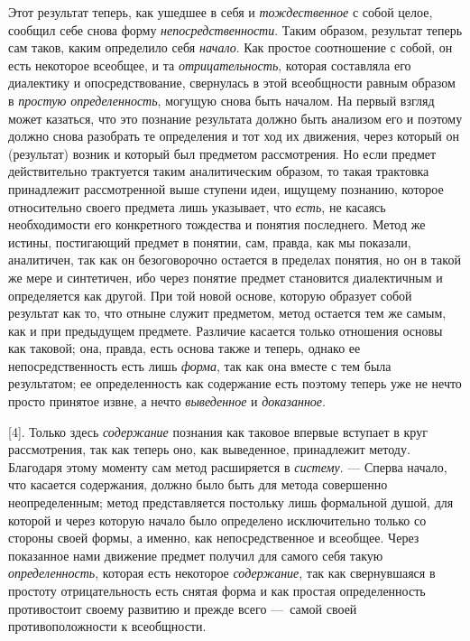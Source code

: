 \documentclass[twoside]{article}
\begin{document}
{{Этот результат теперь, как ушедшее в себя и
{\em тождественное} с
собой целое, сообщил себе снова форму
{\em непосредственности}.
Таким образом, результат теперь сам таков, каким определило
себя {\em начало}. Как
простое соотношение с собой, он есть некоторое всеобщее, и та
{\em отрицательность},
которая составляла его диалектику и опосредствование,
свернулась в этой всеобщности равным образом в
{\em простую определенность},
могущую снова быть началом. На первый взгляд может казаться,
что это познание результата должно быть анализом его и поэтому должно снова
разобрать те определения и тот ход их движения, через который он
(результат) возник и который был предметом рассмотрения. Но если предмет
действительно трактуется таким аналитическим образом, то такая трактовка
принадлежит рассмотренной выше ступени идеи, ищущему познанию, которое
относительно своего предмета лишь указывает, что
{\em есть}, не касаясь
необходимости его конкретного тождества и понятия последнего. Метод же
истины, постигающий предмет в понятии, сам, правда, как мы показали,
аналитичен, так как он безоговорочно остается в пределах понятия, но он в
такой же мере и синтетичен, ибо через понятие предмет становится
диалектичным и определяется как другой. При той новой основе, которую
образует собой результат как то, что отныне служит предметом, метод
остается тем же самым, как и при предыдущем предмете. Различие касается
только отношения основы как таковой; она, правда, есть основа также и
теперь, однако ее непосредственность есть лишь
{\em форма}, так как она
вместе с тем была результатом; ее определенность как содержание есть
поэтому теперь уже не нечто просто принятое извне, а нечто
{\em выведенное} и
{\em доказанное}.

[4]. Только здесь
{\em содержание} познания
как таковое впервые вступает в круг рассмотрения, так как теперь оно, как
выведенное, принадлежит методу. Благодаря этому моменту сам метод
расширяется в {\em систему}. —
Сперва начало, что касается содержания, должно было быть для
метода совершенно неопределенным; метод представляется постольку лишь
формальной душой, для которой и через которую начало было определено
исключительно только со стороны своей формы, а именно, как непосредственное
и всеобщее. Через показанное нами движение предмет получил для самого себя
такую {\em определенность},
которая есть некоторое
{\em содержание}, так как
свернувшаяся в простоту отрицательность есть снятая форма и как простая
определенность противостоит своему развитию и прежде всего
—~самой своей противоположности к всеобщности.

}}
\end{document}
